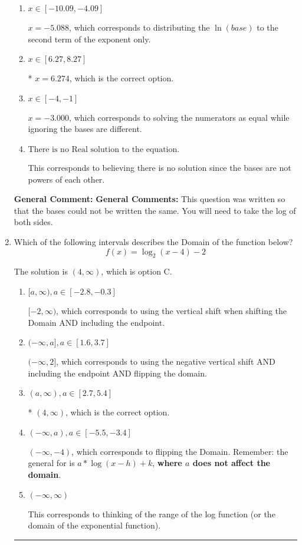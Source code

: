 \documentclass{extbook}[14pt]
\newcommand{\litem}[1]{\item #1

\rule{\textwidth}{0.4pt}}
\begin{document}
\begin{enumerate}
{\begin{enumerate}[label=\Alph*.]
$x = 3.699$, which corresponds to distributing the $\ln(base)$ to the first term of the exponent only.
\item \( x \in [-10.09, -4.09] \)

$x = -5.088$, which corresponds to distributing the $\ln(base)$ to the second term of the exponent only.
\item \( x \in [6.27, 8.27] \)

* $x = 6.274$, which is the correct option.
\item \( x \in [-4, -1] \)

$x = -3.000$, which corresponds to solving the numerators as equal while ignoring the bases are different.
\item \( \text{There is no Real solution to the equation.} \)

This corresponds to believing there is no solution since the bases are not powers of each other.
\end{enumerate}

\textbf{General Comment:} \textbf{General Comments:} This question was written so that the bases could not be written the same. You will need to take the log of both sides.
}
\litem{
Which of the following intervals describes the Domain of the function below?
\[ f(x) = \log_2{(x-4)}-2 \]

The solution is \( (4, \infty) \), which is option C.\begin{enumerate}[label=\Alph*.]
\item \( [a, \infty), a \in [-2.8, -0.3] \)

$[-2, \infty)$, which corresponds to using the vertical shift when shifting the Domain AND including the endpoint.
\item \( (-\infty, a], a \in [1.6, 3.7] \)

$(-\infty, 2]$, which corresponds to using the negative vertical shift AND including the endpoint AND flipping the domain.
\item \( (a, \infty), a \in [2.7, 5.4] \)

* $(4, \infty)$, which is the correct option.
\item \( (-\infty, a), a \in [-5.5, -3.4] \)

$(-\infty, -4)$, which corresponds to flipping the Domain. Remember: the general for is $a*\log(x-h)+k$, \textbf{where $a$ does not affect the domain}.
\item \( (-\infty, \infty) \)

This corresponds to thinking of the range of the log function (or the domain of the exponential function).
\end{enumerate}

}
\end{enumerate}
\end{document}
